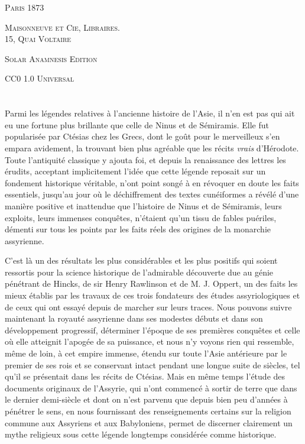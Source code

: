 \documentclass[a4paper, 11pt, oneside, landscape]{article}
\begin{document}
\begin{titlepage}
	\vspace{0.6\baselineskip}

	{\small\scshape Paris 1873}
	
	{\footnotesize\scshape{Maisonneuve et Cie, Libraires. \\ 15, Quai Voltaire}}
	
	\vspace{0.1\baselineskip} %

        \scshape Solar Anamnesis Edition  %
	
	{\scshape\small CC0 1.0 Universal} %
\end{titlepage}
\setlength{\parskip}{1mm plus1mm minus1mm}
\clearpage
\tableofcontents
\clearpage
\small
\section*{}
Parmi les légendes relatives à l'ancienne histoire de l'Asie, il n'en est pas qui ait eu une fortune plus brillante que celle de Ninus et de Sémiramis. Elle fut popularisée par Ctésias chez les Grecs, dont le goût pour le merveilleux s'en empara avidement, la trouvant bien plus agréable que les récits \emph{vrais} d'Hérodote. Toute l'antiquité classique y ajouta foi, et depuis la renaissance des lettres les érudits, acceptant implicitement l'idée que cette légende reposait sur un fondement historique véritable, n'ont point songé à en révoquer en doute les faits essentiels, jusqu'au jour où le déchiffrement des textes cunéiformes a révélé d'une manière positive et inattendue que l'histoire de Ninus et de Sémiramis, leurs exploits, leurs immenses conquêtes, n'étaient qu'un tissu de fables puériles, démenti sur tous les points par les faits réels des origines de la monarchie assyrienne.

C'est là un des résultats les plus considérables et les plus positifs qui soient ressortis pour la science historique de l'admirable découverte due au génie pénétrant de Hincks, de sir Henry Rawlinson et de M. J. Oppert, un des faits les mieux établis par les travaux de ces trois fondateurs des études assyriologiques et de ceux qui ont essayé depuis de marcher sur leurs traces. Nous pouvons suivre maintenant la royauté assyrienne dans ses modestes débuts et dans son développement progressif, déterminer l'époque de ses premières conquêtes et celle où elle atteignit l'apogée de sa puissance, et nous n'y voyons rien qui ressemble, même de loin, à cet empire immense, étendu sur toute l'Asie antérieure par le premier de ses rois et se conservant intact pendant une longue suite de siècles, tel qu'il se présentait dans les récits de Ctésias. Mais en même temps l'étude des documents originaux de l'Assyrie, qui n'ont commencé à sortir de terre que dans le dernier demi-siècle et dont on n'est parvenu que depuis bien peu d'années à pénétrer le sens, en nous fournissant des renseignements certains sur la religion commune aux Assyriens et aux Babyloniens, permet de discerner clairement un mythe religieux sous cette légende longtemps considérée comme historique.
\end{document}
